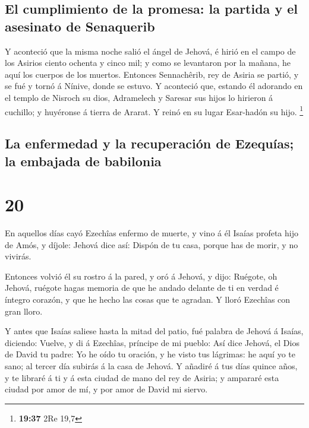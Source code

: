 \hypertarget{el-cumplimiento-de-la-promesa-la-partida-y-el-asesinato-de-senaquerib}{%
\subsection{El cumplimiento de la promesa: la partida y el asesinato de
Senaquerib}\label{el-cumplimiento-de-la-promesa-la-partida-y-el-asesinato-de-senaquerib}}

 Y aconteció que la misma noche salió el ángel de Jehová,
é hirió en el campo de los Asirios ciento ochenta y cinco mil; y como se
levantaron por la mañana, he aquí los cuerpos de los muertos.
 Entonces Sennachêrib, rey de Asiria se partió, y se fué
y tornó á Nínive, donde se estuvo.  Y aconteció que,
estando él adorando en el templo de Nisroch su dios, Adramelech y
Saresar sus hijos lo hirieron á cuchillo; y huyéronse á tierra de
Ararat. Y reinó en su lugar Esar-hadón su hijo. \footnote{\textbf{19:37}
  2Re 19,7}

\hypertarget{la-enfermedad-y-la-recuperaciuxf3n-de-ezequuxedas-la-embajada-de-babilonia}{%
\subsection{La enfermedad y la recuperación de Ezequías; la embajada de
babilonia}\label{la-enfermedad-y-la-recuperaciuxf3n-de-ezequuxedas-la-embajada-de-babilonia}}

\hypertarget{section-19}{%
\section{20}\label{section-19}}

 En aquellos días cayó Ezechîas enfermo de muerte, y vino
á él Isaías profeta hijo de Amós, y díjole: Jehová dice así: Dispón de
tu casa, porque has de morir, y no vivirás.

 Entonces volvió él su rostro á la pared, y oró á Jehová,
y dijo:  Ruégote, oh Jehová, ruégote hagas memoria de que
he andado delante de ti en verdad é íntegro corazón, y que he hecho las
cosas que te agradan. Y lloró Ezechîas con gran lloro.

 Y antes que Isaías saliese hasta la mitad del patio, fué
palabra de Jehová á Isaías, diciendo:  Vuelve, y di á
Ezechîas, príncipe de mi pueblo: Así dice Jehová, el Dios de David tu
padre: Yo he oído tu oración, y he visto tus lágrimas: he aquí yo te
sano; al tercer día subirás á la casa de Jehová.  Y
añadiré á tus días quince años, y te libraré á ti y á esta ciudad de
mano del rey de Asiria; y ampararé esta ciudad por amor de mí, y por
amor de David mi siervo.

